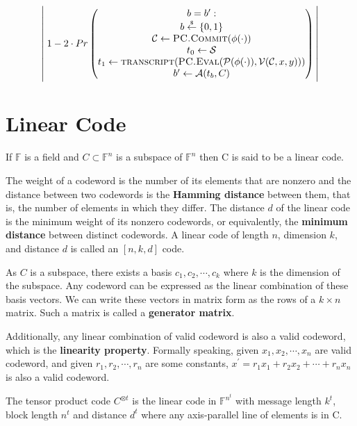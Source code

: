 $$
\left|\rule{0cm}{1.5cm}\right.
1 - 2 \cdot Pr
\begin{pmatrix}
 b = b^\prime : \\
 b \overset{{\scriptscriptstyle\$}}{\leftarrow} \{0, 1\} \\
 \mathcal{C} \leftarrow \textsc{PC.Commit}(\phi(\cdot)) \\
 t_0 \leftarrow \mathcal{S} \\
 t_1 \leftarrow \textsc{transcript}(\textsc{PC.Eval}(\mathcal{P}(\phi(\cdot)), \mathcal{V}(\mathcal{C}, x, y))) \\
 b^\prime \leftarrow \mathcal{A}(t_b, C)
\end{pmatrix}
\left|\rule{0cm}{1.5cm}\right.
$$

\section{Linear Code}

\begin{definition}
If $\mathbb{F}$ is a field and $C \subset \mathbb{F}^n$ is a subspace of $\mathbb{F}^n$ then C is said to be a linear code.
\end{definition}

The weight of a codeword is the number of its elements that are nonzero and the distance between two codewords is the \textbf{Hamming distance} between them, that is, the number of elements in which they differ. The distance $d$ of the linear code is the minimum weight of its nonzero codewords, or equivalently, the \textbf{minimum distance} between distinct codewords. A linear code of length $n$, dimension $k$, and distance $d$ is called an $[n,k,d]$ code.

As $C$ is a subspace, there exists a basis $c_1, c_2, \cdots, c_k$ where $k$ is the dimension of the subspace. Any codeword can be expressed as the linear combination of these basis vectors. We can write these vectors in matrix form as the rows of a $k \times n$ matrix. Such a matrix is called a \textbf{generator matrix}.

Additionally, any linear combination of valid codeword is also a valid codeword, which is the \textbf{linearity property}. Formally speaking, given $x_1, x_2, \cdots, x_n$ are valid codeword, and given $r_1, r_2, \cdots, r_n$ are some constants, $x^\prime = r_1 x_1 + r_2 x_2 + \cdots + r_n x_n$ is also a valid codeword.

\begin{definition}
The tensor product code $C^{\otimes t}$ is the linear code in $\mathbb{F}^{n^t}$ with message length $k^t$, block length $n^t$ and distance $d^t$ where any axis-parallel line of elements is in C.
\end{definition}

